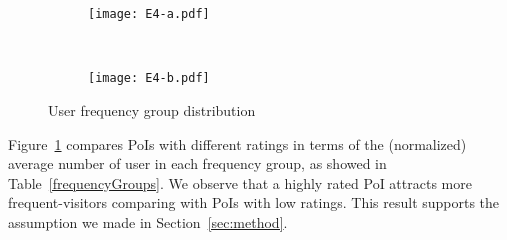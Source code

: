 \begin{figure}[htbp]%
        \centering
        \begin{subfigure}{0.25\textwidth}
               \texttt{[image: E4-a.pdf]}
        \end{subfigure}%
        ~ %
        \begin{subfigure}{0.25\textwidth}
                \texttt{[image: E4-b.pdf]}
        \end{subfigure}
         \caption{User frequency group distribution}\label{E4}
         \vspace{-2mm}
\end{figure}

Figure~\ref{E4} compares PoIs with different ratings in terms of the (normalized) average number of user in each frequency group, as showed in Table~\ref{frequencyGroups}. We observe that a highly rated PoI attracts more frequent-visitors comparing with PoIs with low ratings. This result supports the assumption we made in Section~\ref{sec:method}.
